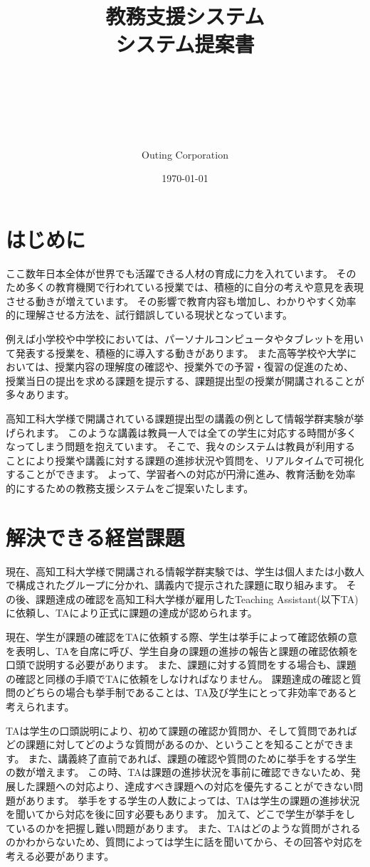 \documentclass[a4j,titlepage]{ujarticle}
\title{
{教務支援システム
\\
システム提案書}
\author{\\
\\
\\
\\
\\
Outing Corporation}
\date{\today}
}
\begin{document}
\maketitle


\tableofcontents

\clearpage

\section{はじめに}
ここ数年日本全体が世界でも活躍できる人材の育成に力を入れています。
そのため多くの教育機関で行われている授業では、積極的に自分の考えや意見を表現させる動きが増えています。
その影響で教育内容も増加し、わかりやすく効率的に理解させる方法を、試行錯誤している現状となっています。

例えば小学校や中学校においては、パーソナルコンピュータやタブレットを用いて発表する授業を、積極的に導入する動きがあります。
また高等学校や大学においては、授業内容の理解度の確認や、授業外での予習・復習の促進のため、
授業当日の提出を求める課題を提示する、課題提出型の授業が開講されることが多々あります。

高知工科大学様で開講されている課題提出型の講義の例として情報学群実験が挙げられます。
このような講義は教員一人では全ての学生に対応する時間が多くなってしまう問題を抱えています。
そこで、我々のシステムは教員が利用することにより授業や講義に対する課題の進捗状況や質問を、リアルタイムで可視化することができます。
よって、学習者への対応が円滑に進み、教育活動を効率的にするための教務支援システムをご提案いたします。

\section{解決できる経営課題}
現在、高知工科大学様で開講される情報学群実験では、学生は個人または小数人で構成されたグループに分かれ、講義内で提示された課題に取り組みます。
その後、課題達成の確認を高知工科大学様が雇用したTeaching Assistant(以下TA)に依頼し、TAにより正式に課題の達成が認められます。

現在、学生が課題の確認をTAに依頼する際、学生は挙手によって確認依頼の意を表明し、TAを自席に呼び、学生自身の課題の進捗の報告と課題の確認依頼を口頭で説明する必要があります。
また、課題に対する質問をする場合も、課題の確認と同様の手順でTAに依頼をしなければなりません。
課題達成の確認と質問のどちらの場合も挙手制であることは、TA及び学生にとって非効率であると考えられます。

TAは学生の口頭説明により、初めて課題の確認か質問か、そして質問であればどの課題に対してどのような質問があるのか、ということを知ることができます。
また、講義終了直前であれば、課題の確認や質問のために挙手をする学生の数が増えます。
この時、TAは課題の進捗状況を事前に確認できないため、発展した課題への対応より、達成すべき課題への対応を優先することができない問題があります。
挙手をする学生の人数によっては、TAは学生の課題の進捗状況を聞いてから対応を後に回す必要もあります。
加えて、どこで学生が挙手をしているのかを把握し難い問題があります。
また、TAはどのような質問がされるのかわからないため、質問によっては学生に話を聞いてから、その回答や対応を考える必要があります。
\end{document}

